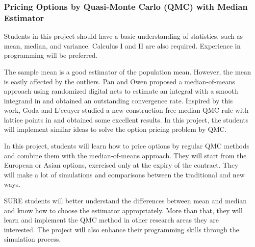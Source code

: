 \subsubsection{Pricing Options by Quasi-Monte Carlo (QMC) with Median Estimator}

Students in this project should have a basic understanding of statistics, such as mean, median, and variance. Calculus I and II are also required. Experience in programming will be preferred.

The sample mean is a good estimator of the population mean. However, the mean is easily affected by the outliers. Pan and Owen proposed a median-of-means approach using randomized digital nets to estimate an integral with a smooth integrand in \cite{SPAMOM22} and obtained an outstanding convergence rate. Inspired by this work, Goda and L'ecuyer studied a new construction-free median QMC rule with lattice points in 
\cite{CFMQMC} and obtained some excellent results. In this project, the students will implement similar ideas to solve the option pricing problem by QMC.

In this project, students will learn how to price options by regular QMC methods and combine them with the median-of-means approach. They will start from the European or Asian options, exercised only at the expiry of the contract. They will make a lot of simulations and comparisons between the traditional and new ways.

SURE students will better understand the differences between mean and median and know how to choose the estimator appropriately. More than that, they will learn and implement the QMC method in other research areas they are interested. The project will also enhance their programming skills through the simulation process. 








